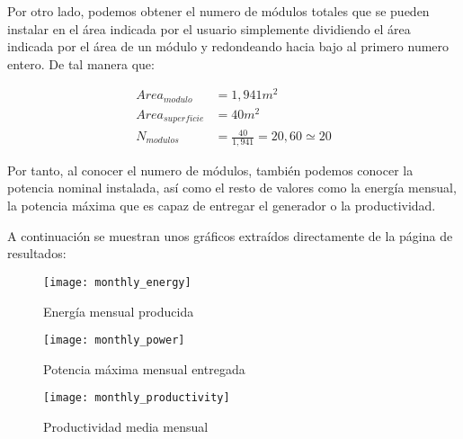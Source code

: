 Por otro lado, podemos obtener el numero de módulos totales que se pueden instalar en el área indicada por el usuario simplemente dividiendo el área indicada por el área de un módulo y redondeando hacia bajo al primero numero entero. De tal manera que:

\begin{equation}
\begin{align*}
Area_{modulo} &=  1,941 m^2 \\
Area_{superficie} &= 40 m^2 \\
N_{modulos} &= \frac{40}{1,941} = 20,60 \simeq 20
\end{align*}
\end{equation}

Por tanto, al conocer el numero de módulos, también podemos conocer la potencia nominal instalada, así como el resto de valores como la energía mensual, la potencia máxima que es capaz de entregar el generador o la productividad.

A continuación se muestran unos gráficos extraídos directamente de la página de resultados:

\begin{figure}[htbp]
\texttt{[image: monthly\_energy]}
\centering
\caption{Energía mensual producida}
\label{fig:fig_energy}
\end{figure}

\begin{figure}[htbp]
\texttt{[image: monthly\_power]}
\centering
\caption{Potencia máxima mensual entregada}
\label{fig:fig_power}
\end{figure}

\begin{figure}[htbp]
\texttt{[image: monthly\_productivity]}
\centering
\caption{Productividad media mensual}
\label{fig:fig_prod}
\end{figure}
